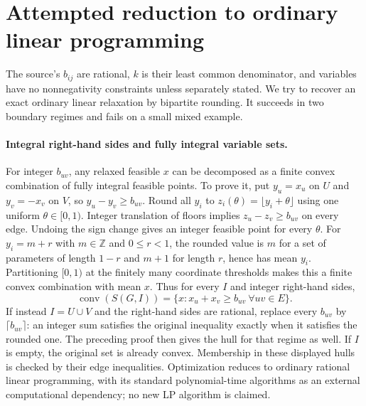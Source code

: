 \documentclass[11pt]{article}
\begin{document}
\section{Attempted reduction to ordinary linear programming}
The source's $b_{ij}$ are rational, $k$ is their least common denominator,
and variables have no nonnegativity constraints unless separately stated.
We try to recover an exact ordinary linear relaxation by bipartite rounding.
It succeeds in two boundary regimes and fails on a small mixed example.

\paragraph{Integral right-hand sides and fully integral variable sets.}
For integer $b_{uv}$, any relaxed feasible $x$ can be decomposed as a
finite convex combination of fully integral feasible points. To prove it,
put $y_u=x_u$ on $U$ and $y_v=-x_v$ on $V$, so
$y_u-y_v\ge b_{uv}$. Round all $y_i$ to
$z_i(\theta)=\lfloor y_i+\theta\rfloor$ using one uniform
$\theta\in[0,1)$. Integer translation of floors implies
$z_u-z_v\ge b_{uv}$ on every edge. Undoing the sign change gives an
integer feasible point for every $\theta$. For $y_i=m+r$ with
$m\in\mathbb Z$ and $0\le r<1$, the rounded value is $m$ for a
set of parameters of length $1-r$ and $m+1$ for length $r$, hence
has mean $y_i$. Partitioning $[0,1)$ at the finitely many coordinate
thresholds makes this a finite convex combination with mean $x$.
Thus for every $I$ and integer right-hand sides,
\[
\operatorname{conv}(S(G,I))=\{x:x_u+x_v\ge b_{uv}\ \forall uv\in E\}.
\]
If instead $I=U\cup V$ and the right-hand sides are rational, replace
every $b_{uv}$ by $\lceil b_{uv}\rceil$: an integer sum satisfies the
original inequality exactly when it satisfies the rounded one. The preceding
proof then gives the hull for that regime as well. If $I$ is empty, the
original set is already convex. Membership in these displayed hulls is
checked by their edge inequalities. Optimization reduces to ordinary rational
linear programming, with its standard polynomial-time algorithms as an
external computational dependency; no new LP algorithm is claimed.
\end{document}
